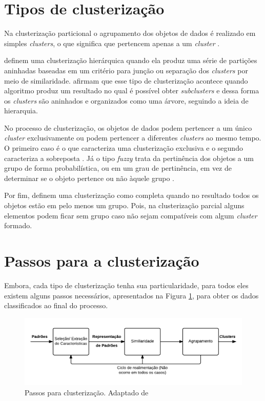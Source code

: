 \section{Tipos de clusterização}
Na clusterização particional o agrupamento dos 
objetos de dados é realizado em simples \textit{clusters}, o que significa que pertencem apenas a um \textit{cluster} \cite{tan2013data}.

 definem uma clusterização hierárquica quando ela produz uma série
de partições aninhadas baseadas em um critério para junção ou separação dos \textit{clusters} por meio de similaridade. 
 afirmam que esse tipo de clusterização acontece quando algoritmo
produz um resultado no qual é possível obter \textit{subclusters} e dessa forma os \textit{clusters} são aninhados
e organizados como uma árvore, seguindo a ideia de hierarquia.

No processo de clusterização, os objetos de dados podem pertencer a um único \textit{cluster} exclusivamente ou podem
pertencer a diferentes \textit{clusters} ao mesmo tempo. O primeiro caso é o que caracteriza uma clusterização exclusiva e o segundo caracteriza a sobreposta \cite{tan2013data}. 
Já o tipo \textit{fuzzy} trata da pertinência dos objetos a um grupo de forma probabilística, 
ou em um grau de pertinência, em vez de determinar se o objeto pertence ou não àquele grupo \cite{tan2013data, clustering_review}.

Por fim,  definem uma clusterização como completa quando no resultado todos os objetos estão em pelo menos um grupo. 
Pois, na clusterização parcial alguns elementos podem ficar sem grupo caso não sejam compatíveis com algum \textit{cluster} formado.

\section{Passos para a clusterização}

Embora, cada tipo de clusterização tenha sua particularidade, para todos eles existem alguns passos necessários, apresentados na Figura \ref{fig:tasks_clustering}, 
para obter os dados classificados ao final do processo.

\begin{figure}[h!]
\centering
\includegraphics[scale=0.5]{figuras/tasks_clustering.png}
\caption{Passos para clusterização. Adaptado de }
\label{fig:tasks_clustering}
\end{figure}

